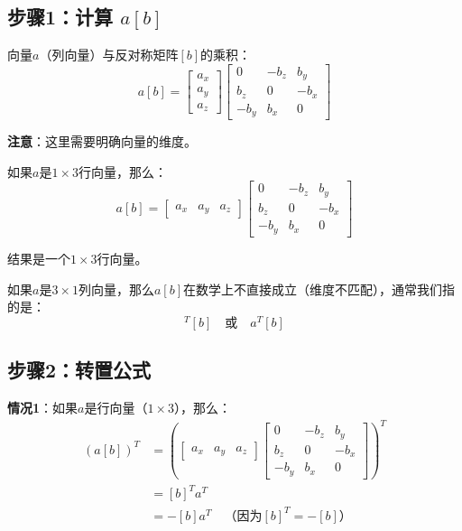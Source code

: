 \documentclass[12pt,a4paper]{article}
\begin{document}
\subsection{步骤1：计算 $a[b]$}

向量$a$（列向量）与反对称矩阵$[b]$的乘积：
\begin{equation}
a[b] = \begin{bmatrix} a_x \\ a_y \\ a_z \end{bmatrix} \begin{bmatrix}
0 & -b_z & b_y \\
b_z & 0 & -b_x \\
-b_y & b_x & 0
\end{bmatrix}
\end{equation}

\textbf{注意}：这里需要明确向量的维度。

如果$a$是$1 \times 3$行向量，那么：
\begin{equation}
a[b] = \begin{bmatrix} a_x & a_y & a_z \end{bmatrix} \begin{bmatrix}
0 & -b_z & b_y \\
b_z & 0 & -b_x \\
-b_y & b_x & 0
\end{bmatrix}
\end{equation}

结果是一个$1 \times 3$行向量。

如果$a$是$3 \times 1$列向量，那么$a[b]$在数学上不直接成立（维度不匹配），通常我们指的是：
\begin{equation}
[a]^T [b] \quad \text{或} \quad a^T [b]
\end{equation}

\subsection{步骤2：转置公式}

\textbf{情况1}：如果$a$是行向量（$1 \times 3$），那么：
\begin{align}
(a[b])^T &= \left( \begin{bmatrix} a_x & a_y & a_z \end{bmatrix} \begin{bmatrix}
0 & -b_z & b_y \\
b_z & 0 & -b_x \\
-b_y & b_x & 0
\end{bmatrix} \right)^T \\
&= [b]^T a^T \\
&= -[b] a^T \quad \text{（因为$[b]^T = -[b]$）}
\end{align}
\end{document}
